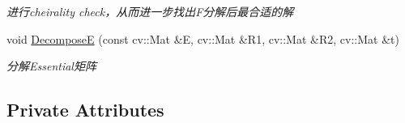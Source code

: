 \begin{DoxyCompactItemize}
\begin{DoxyCompactList}\small\item\em 进行cheirality check，从而进一步找出\+F分解后最合适的解 \end{DoxyCompactList}\item 
void \mbox{\hyperlink{class_o_r_b___s_l_a_m2_1_1_initializer_a78e9e1a14ee76f6cab0f734fa95793af}{DecomposeE}} (const cv\+::\+Mat \&E, cv\+::\+Mat \&R1, cv\+::\+Mat \&R2, cv\+::\+Mat \&t)
\begin{DoxyCompactList}\small\item\em 分解\+Essential矩阵 \end{DoxyCompactList}\end{DoxyCompactItemize}
\subsection*{Private Attributes}
